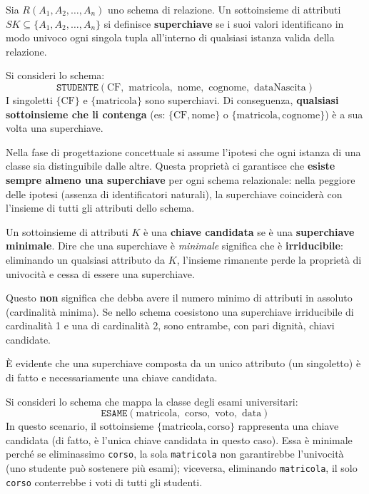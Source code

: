 \medskip

Sia $R(A_1, A_2, \dots, A_n)$ uno schema di relazione. Un sottoinsieme di attributi $SK \subseteq \{A_1, A_2, \dots, A_n\}$ si definisce \textbf{superchiave} se i suoi valori identificano in modo univoco ogni singola tupla all'interno di qualsiasi istanza valida della relazione. 

\begin{example}
Si consideri lo schema: 
$$\texttt{STUDENTE}({\text{CF}}, \text{ matricola}, \text{ nome}, \text{ cognome}, \text{ dataNascita})$$
I singoletti $\{\text{CF}\}$ e $\{\text{matricola}\}$ sono superchiavi. Di conseguenza, \textbf{qualsiasi sottoinsieme che li contenga} (es: $\{\text{CF}, \text{nome}\}$ o $\{\text{matricola}, \text{cognome}\}$) è a sua volta una superchiave.
\end{example}

\begin{observation}
Nella fase di progettazione concettuale si assume l'ipotesi che ogni istanza di una classe sia distinguibile dalle altre. Questa proprietà ci garantisce che \textbf{esiste sempre almeno una superchiave} per ogni schema relazionale: nella peggiore delle ipotesi (assenza di identificatori naturali), la superchiave coinciderà con l'insieme di tutti gli attributi dello schema.
\end{observation}

\medskip

Un sottoinsieme di attributi $K$ è una \textbf{chiave candidata} se è una \textbf{superchiave minimale}. Dire che una superchiave è \textit{minimale} significa che è \textbf{irriducibile}: eliminando un qualsiasi attributo da $K$, l'insieme rimanente perde la proprietà di univocità e cessa di essere una superchiave. 

Questo \textbf{non} significa che debba avere il numero minimo di attributi in assoluto (cardinalità minima). Se nello schema coesistono una superchiave irriducibile di cardinalità 1 e una di cardinalità 2, sono entrambe, con pari dignità, chiavi candidate.

È evidente che una superchiave composta da un unico attributo (un singoletto) è di fatto e necessariamente una chiave candidata.

\begin{example}
Si consideri lo schema che mappa la classe degli esami universitari:
$$\texttt{ESAME}(\text{matricola}, \text{ corso}, \text{ voto}, \text{ data})$$
In questo scenario, il sottoinsieme $\{\text{matricola}, \text{corso}\}$ rappresenta una chiave candidata (di fatto, è l'unica chiave candidata in questo caso). Essa è minimale perché se eliminassimo \texttt{corso}, la sola \texttt{matricola} non garantirebbe l'univocità (uno studente può sostenere più esami); viceversa, eliminando \texttt{matricola}, il solo \texttt{corso} conterrebbe i voti di tutti gli studenti.
\end{example}

